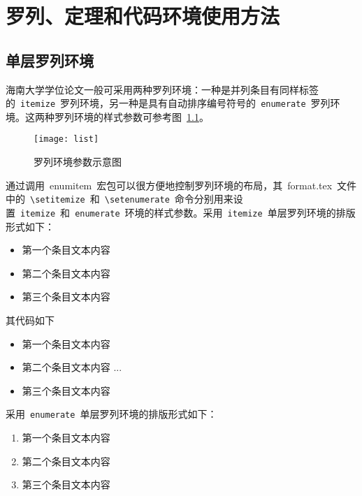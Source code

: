 
\chapter{罗列、定理和代码环境使用方法}

\section{单层罗列环境}

海南大学学位论文一般可采用两种罗列环境：一种是并列条目有同样标签的~\verb|itemize|~罗列环境，另一种是具有自动排序编号符号的~\verb|enumerate|~罗列环境。这两种罗列环境的样式参数可参考图~\ref{fig:list}。
\begin{figure}[htbp]
\centering
\texttt{[image: list]}
\caption{罗列环境参数示意图}\label{fig:list}\vspace{-1em}
\end{figure}

通过调用~enumitem~宏包可以很方便地控制罗列环境的布局，其~format.tex~文件中的~\verb|\setitemize|~和~\verb|\setenumerate|~命令分别用来设置~\verb|itemize|~和~\verb|enumerate|~环境的样式参数。采用~\verb|itemize|~单层罗列环境的排版形式如下：

\begin{itemize}
\item 第一个条目文本内容
\item 第二个条目文本内容
\item 第三个条目文本内容
\end{itemize}

其代码如下

\begin{VerbWithBreak}
\begin{itemize}
  \item 第一个条目文本内容
  \item 第二个条目文本内容
  ...
  \item 第三个条目文本内容
\end{itemize}
\end{VerbWithBreak}

采用~\verb|enumerate|~单层罗列环境的排版形式如下：

\begin{enumerate}
\item 第一个条目文本内容
\item 第二个条目文本内容
\item 第三个条目文本内容
\end{enumerate}

